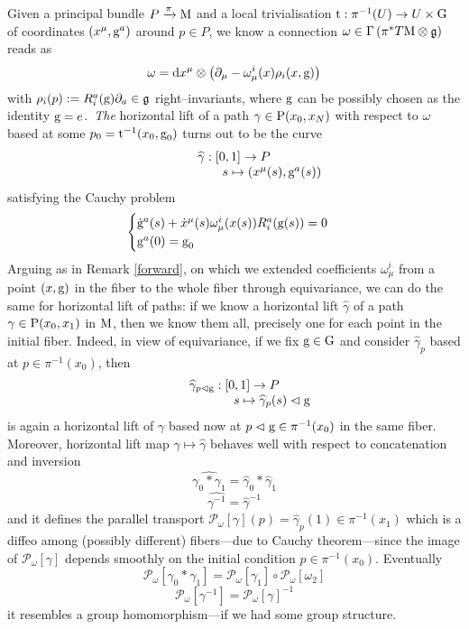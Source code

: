 Given a principal bundle $P\xrightarrow{\pi}\M$ and a local trivialisation $\t:\pi^{-1}(U)\to U\times\G$ of coordinates $(x^\mu,\g^a)$ around $p\in P$, we know a connection $\omega\in\Sec{\pi^*T\M\otimes\mathfrak{g}}$ reads as
$$\omega=\d x^\mu\otimes\left(\der_\mu-\omega^i_\mu(x)\rho_i(x,\g)\right)$$
with $\rho_i(p):=R^a_i(\g)\der_a\in\mathfrak{g}$ right--invariants, where $\g$ can be possibly chosen as the identity $\g=e$.\, \emph{The} horizontal lift of a path $\gamma\in\P(x_0,x_N)$ with respect to $\omega$ based at some $p_0=\t^{-1}(x_0,\g_0)$ turns out to be the curve 
$$\begin{matrix}
    \widehat{\gamma}:[0,1]\to P\\
    \qquad\qquad\qquad s\mapsto\left(x^\mu(s),\g^a(s)\right)
\end{matrix}$$
satisfying the Cauchy problem
$$\begin{cases}
    \dot{\g}^a(s)+\dot{x}^\mu(s)\omega^i_\mu(x(s))R^a_i(\g(s))=0\\
    \g^a(0)=\g_0
\end{cases}$$
Arguing as in Remark \ref{forward}, on which we extended coefficients $\omega^i_\mu$ from a point $(x,\g)$ in the fiber to the whole fiber through equivariance, we can do the same for horizontal lift of paths: if we know a horizontal lift $\widehat{\gamma}$ of a path $\gamma\in\P(x_0,x_1)$ in $\M$, then we know them all, precisely one for each point in the initial fiber. Indeed, in view of equivariance, if we fix $\g\in\G$ and consider $\widehat{\gamma}_p$ based at $p\in\pi^{-1}(x_0)$, then
$$\begin{matrix}
    \widehat{\gamma}_{p\vartriangleleft\g}:[0,1]\to P\\
    \qquad\qquad\qquad s\mapsto\widehat{\gamma}_p(s)\vartriangleleft\g
\end{matrix}$$
is again a horizontal lift of $\gamma$ based now at $p\vartriangleleft\g\in\pi^{-1}(x_0)$ in the same fiber. Moreover, horizontal lift map $\gamma\mapsto\widehat{\gamma}$ behaves well with respect to concatenation and inversion
$$\widehat{\gamma_0*\gamma_1}=\widehat{\gamma}_0*\widehat{\gamma}_1$$
$$\widehat{\gamma^{-1}}=\widehat{\gamma}^{-1}$$
and it defines the parallel transport $\mathcal{P}_\omega[\gamma](p)=\widehat{\gamma}_p(1)\in\pi^{-1}(x_1)$ which is a diffeo among (possibly different) fibers---due to Cauchy theorem---since the image of $\mathcal{P}_\omega[\gamma]$ depends smoothly on the initial condition $p\in\pi^{-1}(x_0)$. Eventually $$\mathcal{P}_\omega[\gamma_0*\gamma_1]=\mathcal{P}_\omega[\gamma_1]\circ\mathcal{P}_\omega[\omega_2]$$ $$\mathcal{P}_\omega[\gamma^{-1}]=\mathcal{P}_\omega[\gamma]^{-1}$$
it resembles a group homomorphism---if we had some group structure.

